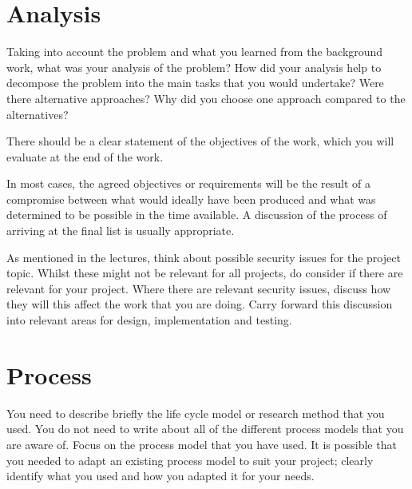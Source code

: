 \section{Analysis}
Taking into account the problem and what you learned from the background work, what was your analysis of the problem? How did your analysis help to decompose the problem into the main tasks that you would undertake? Were there alternative approaches? Why did you choose one approach compared to the alternatives? 

There should be a clear statement of the objectives of the work, which you will evaluate at the end of the work. 

In most cases, the agreed objectives or requirements will be the result of a compromise between what would ideally have been produced and what was determined to be possible in the time available. A discussion of the process of arriving at the final list is usually appropriate.

As mentioned in the lectures, think about possible security issues for the project topic. Whilst these might not be relevant for all projects, do consider if there are relevant for your project. Where there are relevant security issues, discuss how they will this affect the work that you are doing. Carry forward this discussion into relevant areas for design, implementation and testing.

\section{Process}
You need to describe briefly the life cycle model or research method that you used. You do not need to write about all of the different process models that you are aware of. Focus on the process model that you have used. It is possible that you needed to adapt an existing process model to suit your project; clearly identify what you used and how you adapted it for your needs.

